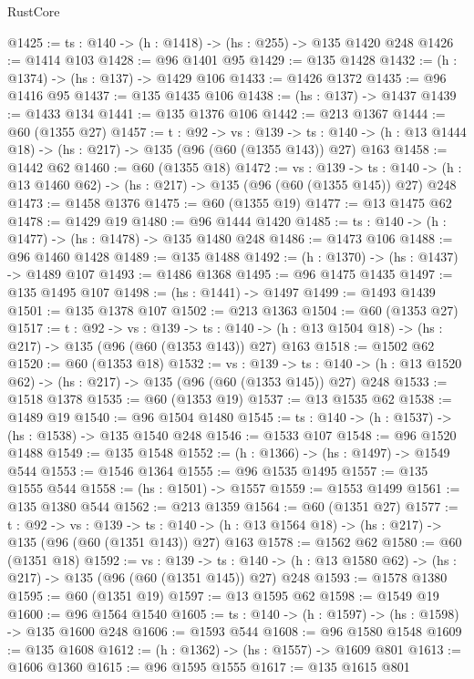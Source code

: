 \begin{lexlean}{RustCore}
\begin{coremodule}
@1425 := {ts : @140} -> (h : @1418) -> (hs : @255) -> @135 @1420 @248
@1426 := @1414 @103
@1428 := @96 @1401 @95
@1429 := @135 @1428
@1432 := (h : @1374) -> (hs : @137) -> @1429 @106
@1433 := @1426 @1372
@1435 := @96 @1416 @95
@1437 := @135 @1435 @106
@1438 := (hs : @137) -> @1437
@1439 := @1433 @134
@1441 := @135 @1376 @106
@1442 := @213 @1367
@1444 := @60 (@1355 @27)
@1457 := {t : @92} ->
  {vs : @139} ->
  {ts : @140} -> (h : @13 @1444 @18) -> (hs : @217) -> @135 (@96 (@60 (@1355 @143)) @27) @163
@1458 := @1442 @62
@1460 := @60 (@1355 @18)
@1472 := {vs : @139} ->
  {ts : @140} -> (h : @13 @1460 @62) -> (hs : @217) -> @135 (@96 (@60 (@1355 @145)) @27) @248
@1473 := @1458 @1376
@1475 := @60 (@1355 @19)
@1477 := @13 @1475 @62
@1478 := @1429 @19
@1480 := @96 @1444 @1420
@1485 := {ts : @140} -> (h : @1477) -> (hs : @1478) -> @135 @1480 @248
@1486 := @1473 @106
@1488 := @96 @1460 @1428
@1489 := @135 @1488
@1492 := (h : @1370) -> (hs : @1437) -> @1489 @107
@1493 := @1486 @1368
@1495 := @96 @1475 @1435
@1497 := @135 @1495 @107
@1498 := (hs : @1441) -> @1497
@1499 := @1493 @1439
@1501 := @135 @1378 @107
@1502 := @213 @1363
@1504 := @60 (@1353 @27)
@1517 := {t : @92} ->
  {vs : @139} ->
  {ts : @140} -> (h : @13 @1504 @18) -> (hs : @217) -> @135 (@96 (@60 (@1353 @143)) @27) @163
@1518 := @1502 @62
@1520 := @60 (@1353 @18)
@1532 := {vs : @139} ->
  {ts : @140} -> (h : @13 @1520 @62) -> (hs : @217) -> @135 (@96 (@60 (@1353 @145)) @27) @248
@1533 := @1518 @1378
@1535 := @60 (@1353 @19)
@1537 := @13 @1535 @62
@1538 := @1489 @19
@1540 := @96 @1504 @1480
@1545 := {ts : @140} -> (h : @1537) -> (hs : @1538) -> @135 @1540 @248
@1546 := @1533 @107
@1548 := @96 @1520 @1488
@1549 := @135 @1548
@1552 := (h : @1366) -> (hs : @1497) -> @1549 @544
@1553 := @1546 @1364
@1555 := @96 @1535 @1495
@1557 := @135 @1555 @544
@1558 := (hs : @1501) -> @1557
@1559 := @1553 @1499
@1561 := @135 @1380 @544
@1562 := @213 @1359
@1564 := @60 (@1351 @27)
@1577 := {t : @92} ->
  {vs : @139} ->
  {ts : @140} -> (h : @13 @1564 @18) -> (hs : @217) -> @135 (@96 (@60 (@1351 @143)) @27) @163
@1578 := @1562 @62
@1580 := @60 (@1351 @18)
@1592 := {vs : @139} ->
  {ts : @140} -> (h : @13 @1580 @62) -> (hs : @217) -> @135 (@96 (@60 (@1351 @145)) @27) @248
@1593 := @1578 @1380
@1595 := @60 (@1351 @19)
@1597 := @13 @1595 @62
@1598 := @1549 @19
@1600 := @96 @1564 @1540
@1605 := {ts : @140} -> (h : @1597) -> (hs : @1598) -> @135 @1600 @248
@1606 := @1593 @544
@1608 := @96 @1580 @1548
@1609 := @135 @1608
@1612 := (h : @1362) -> (hs : @1557) -> @1609 @801
@1613 := @1606 @1360
@1615 := @96 @1595 @1555
@1617 := @135 @1615 @801

\end{coremodule}
\end{lexlean}
